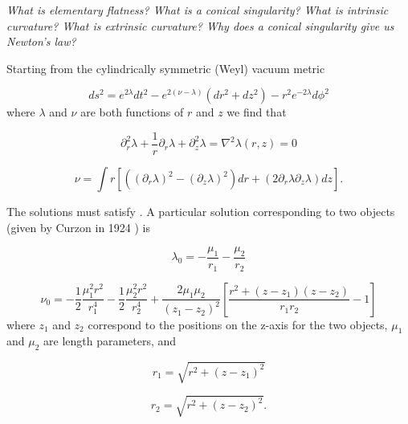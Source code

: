 \documentclass[12pt]{article}
\begin{document}
\textit{What is elementary flatness? What is a conical singularity? What is intrinsic curvature? What is extrinsic curvature? Why does a conical singularity give us Newton's law?}

Starting from the cylindrically symmetric (Weyl) vacuum metric \cite{synge_relativity}

\begin{equation}
	ds^{2}=e^{2\lambda}dt^{2}-e^{2\left(\nu-\lambda\right)}\left(dr^{2}+dz^{2}\right)-r^{2}e^{-2\lambda}d\phi^{2}
	\label{eq:weyl-vacuum-metric}
\end{equation}
where $\lambda$ and $\nu$ are both functions of $r$ and $z$ we find that

\begin{equation}
\partial^{2}_{r}\lambda+\frac{1}{r}\partial_{r}\lambda+\partial^{2}_{z}\lambda=\nabla^2\lambda(r,z)=0
\label{eq:laplace-r-z}
\end{equation}

\begin{equation}
\nu=\int r[\left(\left(\partial_{r}\lambda\right)^{2}-\left(\partial_{z}\lambda\right)^{2}\right)dr+\left(2\partial_{r}\lambda\partial_{z}\lambda\right)dz].
\label{eq:nu}
\end{equation}

The solutions must satisfy . A particular solution corresponding to two objects (given by Curzon in 1924 \cite{curzon1924} ) is

\begin{equation}
\lambda_0=-\frac{\mu_1}{r_1}-\frac{\mu_2}{r_2}
\label{eq:lambda-0}
\end{equation}

\begin{equation}
	\label{eq:nu-0}
	\nu_0=-\frac{1}{2}\frac{\mu_{1}^{2}r^2}{r_{1}^{4}}-\frac{1}{2}\frac{\mu_{2}^{2}r^2}{r_{2}^{4}}+\frac{2\mu_1\mu_2}{(z_1-z_2)^2}\left[\frac{r^2+(z-z_1)(z-z_2)}{r_{1}r_{2}}-1\right]
\end{equation}
where $z_1$ and $z_2$ correspond to the positions on the z-axis for the two objects, $\mu_1$ and $\mu_2$ are length parameters, and

\begin{equation}
r_1=\sqrt{r^2+(z-z_1)^2}
\label{eq:r_1}
\end{equation}

\begin{equation}
r_2=\sqrt{r^2+(z-z_2)^2}.
\label{eq:r_2}
\end{equation}
\end{document}

